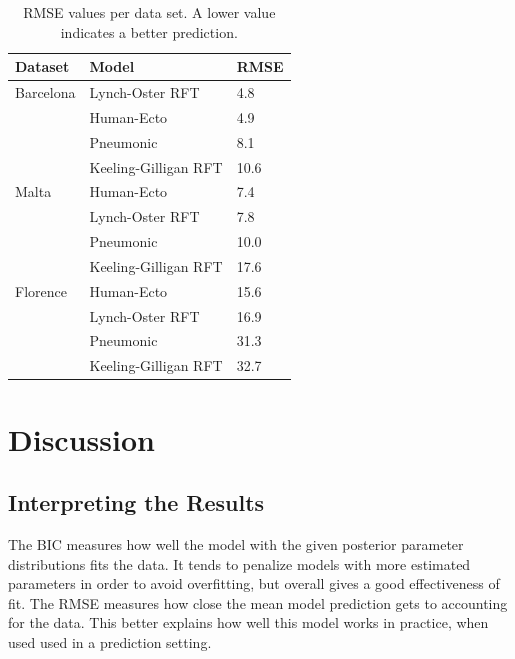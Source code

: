 \documentclass [letterpaper, 12pt] {article}
\begin{document}
\begin{table}[H]
	\begin{center}
		\begin{tabular}{|l|l|l|}
			\hline
			\textbf{Dataset} & \textbf{Model}       & \textbf{RMSE} \\ \hline
			Barcelona        & Lynch-Oster RFT      & 4.8           \\ \cline{2-3}
			                 & Human-Ecto           & 4.9           \\ \cline{2-3}
			                 & Pneumonic            & 8.1           \\ \cline{2-3}
			                 & Keeling-Gilligan RFT & 10.6          \\ \hline
			Malta            & Human-Ecto           & 7.4           \\ \cline{2-3}
			                 & Lynch-Oster RFT      & 7.8           \\ \cline{2-3}
			                 & Pneumonic            & 10.0          \\ \cline{2-3}
			                 & Keeling-Gilligan RFT & 17.6          \\ \hline
			Florence         & Human-Ecto           & 15.6          \\ \cline{2-3}
			                 & Lynch-Oster RFT      & 16.9          \\ \cline{2-3}
			                 & Pneumonic            & 31.3          \\ \cline{2-3}
			                 & Keeling-Gilligan RFT & 32.7          \\ \hline
		\end{tabular}
	\end{center}
	\caption{RMSE values per data set. A lower value indicates a better prediction.}
\end{table}


\newpage
\section {Discussion}
\vspace{-0.3cm}
\subsection{Interpreting the Results}
\vspace{-0.3cm}
The BIC measures how well the model with the given posterior parameter distributions fits the data. It tends to penalize models with more estimated parameters in order to avoid overfitting, but overall gives a good effectiveness of fit.
The RMSE measures how close the mean model prediction gets to accounting for the data. This better explains how well this model works in practice, when used used in a prediction setting.
\end{document}
